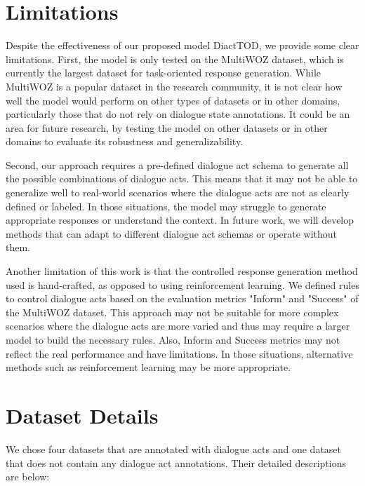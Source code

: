 \section*{Limitations}

Despite the effectiveness of our proposed model DiactTOD, we provide some clear limitations.
First, the model is only tested on the MultiWOZ dataset, which is currently the largest dataset for task-oriented response generation. 
While MultiWOZ is a popular dataset in the research community, it is not clear how well the model would perform on other types of datasets or in other domains, particularly those that do not rely on dialogue state annotations. 
It could be an area for future research, by testing the model on other datasets or in other domains to evaluate its robustness and generalizability.

Second, our approach requires a pre-defined dialogue act schema to generate all the possible combinations of dialogue acts. 
This means that it may not be able to generalize well to real-world scenarios where the dialogue acts are not as clearly defined or labeled. 
In those situations, the model may struggle to generate appropriate responses or understand the context. 
In future work, we will develop methods that can adapt to different dialogue act schemas or operate without them.

Another limitation of this work is that the controlled response generation method used is hand-crafted, as opposed to using reinforcement learning. 
We defined rules to control dialogue acts based on the evaluation metrics "Inform" and "Success" of the MultiWOZ dataset. 
This approach may not be suitable for more complex scenarios where the dialogue acts are more varied and thus may require a larger model to build the necessary rules.
Also, Inform and Success metrics may not reflect the real performance and have limitations.
In those situations, alternative methods such as reinforcement learning may be more appropriate.

\newpage

\appendix

\section{Dataset Details}

We chose four datasets that are annotated with dialogue acts and one dataset that does not contain any dialogue act annotations. 
Their detailed descriptions are below:

